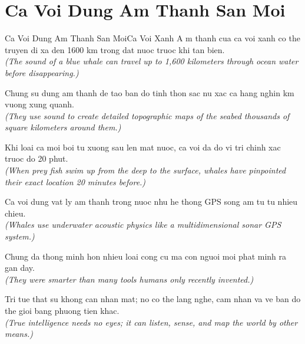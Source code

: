 \section{Ca Voi Dung Am Thanh San Moi}
\begin{truyen}{Ca Voi Dung Am Thanh San Moi}{Ca Voi Xanh}
A m thanh cua ca voi xanh co the truyen di xa den 1600 km trong dat nuoc truoc khi tan bien.\\
\textit{(The sound of a blue whale can travel up to 1,600 kilometers through ocean water before disappearing.)}

Chung su dung am thanh de tao ban do tinh thon sac nu xac ca hang nghin km vuong xung quanh.\\
\textit{(They use sound to create detailed topographic maps of the seabed thousands of square kilometers around them.)}

Khi loai ca moi boi tu xuong sau len mat nuoc, ca voi da do vi tri chinh xac truoc do 20 phut.\\
\textit{(When prey fish swim up from the deep to the surface, whales have pinpointed their exact location 20 minutes before.)}

Ca voi dung vat ly am thanh trong nuoc nhu he thong GPS song am tu tu nhieu chieu.\\
\textit{(Whales use underwater acoustic physics like a multidimensional sonar GPS system.)}

Chung da thong minh hon nhieu loai cong cu ma con nguoi moi phat minh ra gan day.\\
\textit{(They were smarter than many tools humans only recently invented.)}

\end{truyen}
\begin{baihoc}
  Tri tue that su khong can nhan mat; no co the lang nghe, cam nhan va ve ban do the gioi bang phuong tien khac.\\
  \textit{(True intelligence needs no eyes; it can listen, sense, and map the world by other means.)}
\end{baihoc}

